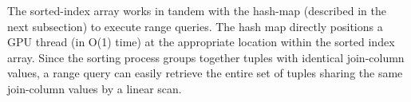 \documentclass[nonacm,sigplan]{acmart}
\begin{document}
The sorted-index array works in tandem with the hash-map (described in the next subsection) to execute range queries. The hash map directly positions a GPU thread (in O(1) time) at the appropriate location within the sorted index array. Since the sorting process groups together tuples with identical join-column values, a range query can easily retrieve the entire set of tuples sharing the same join-column values by a linear scan.
%
%
%


\end{document}
